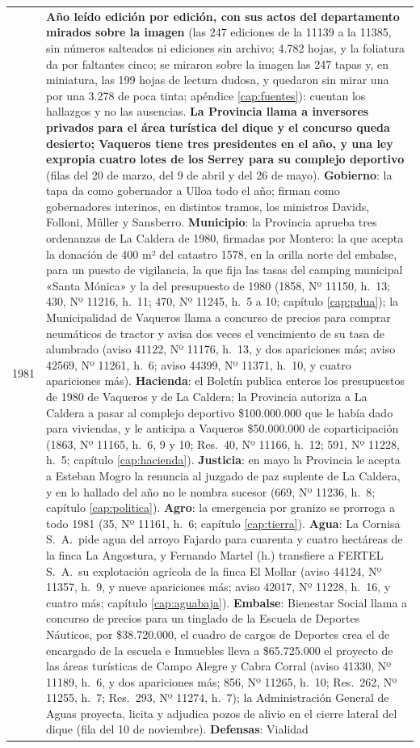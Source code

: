 \begin{longtable}{@{}p{2.7cm}p{10.3cm}@{}}
1981 & \textbf{Año leído edición por edición, con sus actos del departamento mirados sobre la imagen} (las 247 ediciones de la 11139 a la 11385, sin números salteados ni ediciones sin archivo; 4.782 hojas, y la foliatura da por faltantes cinco; se miraron sobre la imagen las 247 tapas y, en miniatura, las 199 hojas de lectura dudosa, y quedaron sin mirar una por una 3.278 de poca tinta; apéndice \ref{cap:fuentes}): cuentan los hallazgos y no las ausencias. \textbf{La Provincia llama a inversores privados para el área turística del dique y el concurso queda desierto; Vaqueros tiene tres presidentes en el año, y una ley expropia cuatro lotes de los Serrey para su complejo deportivo} (filas del 20 de marzo, del 9 de abril y del 26 de mayo). \textbf{Gobierno}: la tapa da como gobernador a Ulloa todo el año; firman como gobernadores interinos, en distintos tramos, los ministros Davids, Folloni, Müller y Sansberro. \textbf{Municipio}: la Provincia aprueba tres ordenanzas de La Caldera de 1980, firmadas por Montero: la que acepta la donación de 400 m² del catastro 1578, en la orilla norte del embalse, para un puesto de vigilancia, la que fija las tasas del camping municipal «Santa Mónica» y la del presupuesto de 1980 (1858, Nº 11150, h.\ 13; 430, Nº 11216, h.\ 11; 470, Nº 11245, h.\ 5 a 10; capítulo \ref{cap:pdua}); la Municipalidad de Vaqueros llama a concurso de precios para comprar neumáticos de tractor y avisa dos veces el vencimiento de su tasa de alumbrado (aviso 41122, Nº 11176, h.\ 13, y dos apariciones más; aviso 42569, Nº 11261, h.\ 6; aviso 44399, Nº 11371, h.\ 10, y cuatro apariciones más). \textbf{Hacienda}: el Boletín publica enteros los presupuestos de 1980 de Vaqueros y de La Caldera; la Provincia autoriza a La Caldera a pasar al complejo deportivo \$100.000.000 que le había dado para viviendas, y le anticipa a Vaqueros \$50.000.000 de coparticipación (1863, Nº 11165, h.\ 6, 9 y 10; Res.\ 40, Nº 11166, h.\ 12; 591, Nº 11228, h.\ 5; capítulo \ref{cap:hacienda}). \textbf{Justicia}: en mayo la Provincia le acepta a Esteban Mogro la renuncia al juzgado de paz suplente de La Caldera, y en lo hallado del año no le nombra sucesor (669, Nº 11236, h.\ 8; capítulo \ref{cap:politica}). \textbf{Agro}: la emergencia por granizo se prorroga a todo 1981 (35, Nº 11161, h.\ 6; capítulo \ref{cap:tierra}). \textbf{Agua}: La Cornisa S.\ A.\ pide agua del arroyo Fajardo para cuarenta y cuatro hectáreas de la finca La Angostura, y Fernando Martel (h.) transfiere a FERTEL S.\ A.\ su explotación agrícola de la finca El Mollar (aviso 44124, Nº 11357, h.\ 9, y nueve apariciones más; aviso 42017, Nº 11228, h.\ 16, y cuatro más; capítulo \ref{cap:aguabaja}). \textbf{Embalse}: Bienestar Social llama a concurso de precios para un tinglado de la Escuela de Deportes Náuticos, por \$38.720.000, el cuadro de cargos de Deportes crea el de encargado de la escuela e Inmuebles lleva a \$65.725.000 el proyecto de las áreas turísticas de Campo Alegre y Cabra Corral (aviso 41330, Nº 11189, h.\ 6, y dos apariciones más; 856, Nº 11265, h.\ 10; Res.\ 262, Nº 11255, h.\ 7; Res.\ 293, Nº 11274, h.\ 7); la Administración General de Aguas proyecta, licita y adjudica pozos de alivio en el cierre lateral del dique (fila del 10 de noviembre). \textbf{Defensas}: Vialidad 
\end{longtable}
